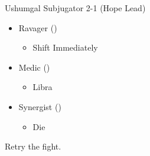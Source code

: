 \renewcommand{\first}{[1] Ravager (\rav)}
\renewcommand{\second}{[2] Medic (\med)}
\renewcommand{\third}{[3] Synergist (\syn)}
	\begin{battle}{Ushumgal Subjugator 2-1 (Hope Lead)}
		\begin{itemize}
			\item \first
			      \begin{itemize}
				      \item Shift Immediately
			      \end{itemize}
			\item \second
			      \begin{itemize}
				      \item Libra
			      \end{itemize}
			\item \third
			      \begin{itemize}
				      \item Die
			      \end{itemize}
		\end{itemize}
	\end{battle}
	Retry the fight.
	\vfill
